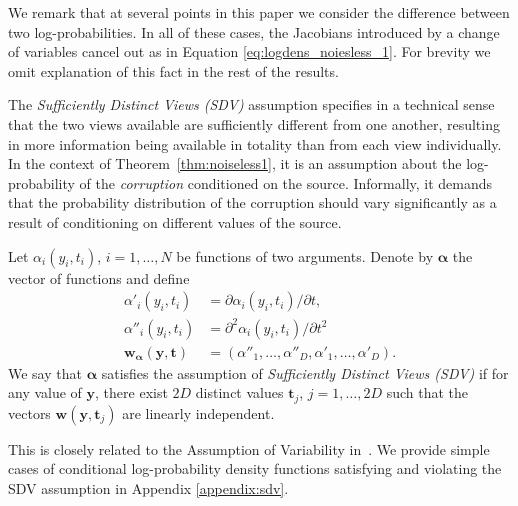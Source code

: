 We remark that at several points in this paper we consider the difference between two log-probabilities.
In all of these cases, the Jacobians introduced by a change of variables cancel out as in Equation \ref{eq:logdens_noiesless_1}.
For brevity we omit explanation of this fact in the rest of the results.

The \emph{Sufficiently Distinct Views (SDV)} assumption specifies in a technical sense that the two views available are sufficiently different from one another,
resulting in more information being available in totality than from each view individually.
In the context of Theorem~\ref{thm:noiseless1}, it is an assumption about the log-probability of the \emph{corruption} conditioned on the source.
Informally, it demands that the probability distribution of the corruption should vary significantly as a result of conditioning on different values of the source.

\begin{definition}\label{suff_dist_assumption}
Let $\alpha_i(y_i, t_i)$, $i=1,\ldots, N$ be functions of two arguments.
Denote by $\bm\alpha$ the vector of functions and define
\begin{align}
\alpha'_{i}(y_i, t_i)&= \partial \alpha_{i}(y_i, t_i)/\partial t, \label{eq:convention1}\\
\alpha''_{i}(y_i, t_i)&=\partial^2 \alpha_{i}(y_i, t_i)/\partial t^2\, \label{eq:convention2}\\
\bm{w}_{\bm\alpha}(\bm{y}, \bm{t}) &= (\alpha''_{1}, \ldots, \alpha''_{D}, \alpha'_{1}, \ldots,\alpha'_{D}).
\end{align}
We say that $\bm{\alpha}$ satisfies the assumption of \emph{Sufficiently Distinct Views (SDV)} if for any value of $\bm{y}$, there exist $2D$ distinct values $\bm{t}_j$, $j=1, \ldots, 2D$ such that the vectors $\bm{w}(\bm{y},\bm{t}_j)$ are linearly independent.
    \\    \end{definition}
This is closely related to the Assumption of Variability in~\cite{hyvarinen19a}.
We provide simple cases of conditional log-probability density functions satisfying and violating the SDV assumption in Appendix \ref{appendix:sdv}.

